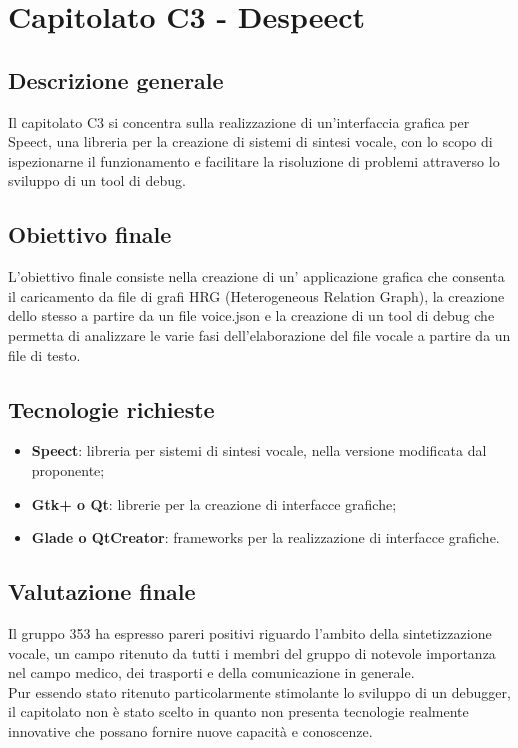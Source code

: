 \documentclass[StudioDiFattibilità.tex]{subfiles}
\begin{document}
\chapter{Capitolato C3 - Despeect}
\section{Descrizione generale}
Il capitolato C3 si concentra sulla realizzazione di un'interfaccia grafica per Speect, una libreria per la creazione di sistemi di sintesi vocale, con lo scopo di ispezionarne il funzionamento e facilitare la risoluzione di problemi attraverso lo sviluppo di un tool di debug. 
\section{Obiettivo finale}
L'obiettivo finale consiste nella creazione di un’ applicazione grafica che consenta il caricamento da file di grafi HRG (Heterogeneous Relation Graph), la creazione dello stesso a partire da un file voice.json e la creazione di un tool di debug che permetta di analizzare le varie fasi dell'elaborazione del file vocale a partire da un file di testo.
\section{Tecnologie richieste}
\begin{itemize}
	\item \textbf{Speect}: libreria per sistemi di sintesi vocale, nella versione modificata dal proponente;
	\item \textbf{Gtk+ o Qt}: librerie per la creazione di interfacce grafiche;
	\item \textbf{Glade o QtCreator}: frameworks per la realizzazione di interfacce grafiche.
\end{itemize}
\section{Valutazione finale}
Il gruppo 353 ha espresso pareri positivi riguardo l'ambito della sintetizzazione vocale, un campo ritenuto da tutti i membri del gruppo di notevole importanza nel campo medico, dei trasporti e della comunicazione in generale.\\
Pur essendo stato ritenuto particolarmente stimolante lo sviluppo di un debugger, il capitolato non è stato scelto in quanto non presenta tecnologie realmente innovative che possano fornire nuove capacità e conoscenze.
\end{document}

